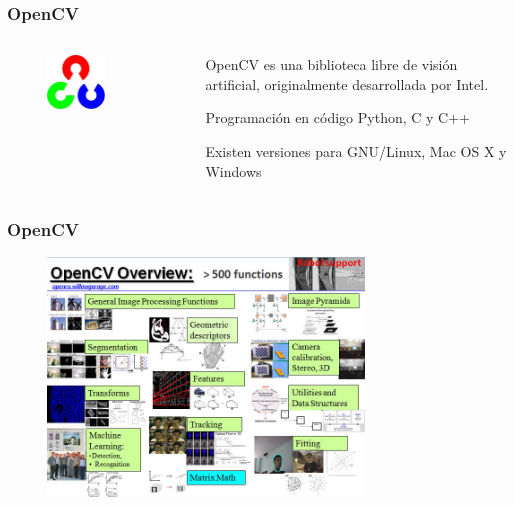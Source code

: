\begin{frame}\frametitle{OpenCV}
  \begin{columns}
    \begin{column}{0.5\textwidth}
      \begin{figure}
        \centering
        \includegraphics[width=0.6\textwidth]{Figures/OpenCVLogo.png}
      \end{figure}
    \end{column}
    \begin{column}{0.5\textwidth}
      OpenCV es una biblioteca libre de visión artificial, originalmente desarrollada por Intel.
      
      Programación en código  Python, C y C++
      
      Existen versiones para GNU/Linux, Mac OS X y Windows
    \end{column}
    \end{columns}
    \end{frame}

\begin{frame}\frametitle{OpenCV}
\begin{figure}[h!]
        \centering
        \includegraphics[width=0.75\textwidth]{Figures/OpenCVOverview.png}
\end{figure}
\end{frame}


